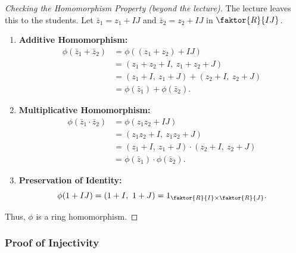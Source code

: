 \begin{content}

\begin{proof}[Checking the Homomorphism Property (beyond the lecture)]
The lecture leaves this to the students. Let $\bar{z}_1 = z_1 + IJ$ and $\bar{z}_2 = z_2 + IJ$ in $\faktor{R}{IJ}$.
\begin{enumerate}[label=\textbf{(\arabic*)}]
    \setcounter{enumi}{0} \item \textbf{Additive Homomorphism:}
    \begin{align*}
    \phi(\bar{z}_1 + \bar{z}_2) &= \phi((z_1 + z_2) + IJ) \\
    &= (z_1 + z_2 + I, \ z_1 + z_2 + J) \\
    &= (z_1 + I, \ z_1 + J) + (z_2 + I, \ z_2 + J) \\
    &= \phi(\bar{z}_1) + \phi(\bar{z}_2).
    \end{align*}
    \setcounter{enumi}{1} \item \textbf{Multiplicative Homomorphism:}
    \begin{align*}
    \phi(\bar{z}_1 \cdot \bar{z}_2) &= \phi(z_1 z_2 + IJ) \\
    &= (z_1 z_2 + I, \ z_1 z_2 + J) \\
    &= (z_1 + I, \ z_1 + J) \cdot (z_2 + I, \ z_2 + J) \\
    &= \phi(\bar{z}_1) \cdot \phi(\bar{z}_2).
    \end{align*}
    \setcounter{enumi}{2} \item \textbf{Preservation of Identity:}
    \[
    \phi(1 + IJ) = (1 + I, \ 1 + J) = 1_{\faktor{R}{I} \times \faktor{R}{J}}.
    \]
\end{enumerate}
Thus, $\phi$ is a ring homomorphism.
\end{proof}
\end{content}

\subsubsection{Proof of Injectivity}

